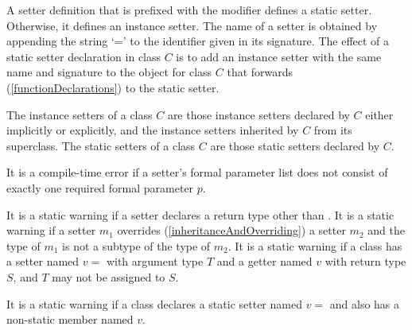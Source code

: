 \documentclass{article}
\begin{document}

\LMHash{}
A setter definition that is prefixed with the \STATIC{} modifier defines a static setter.
Otherwise, it defines an instance setter.
The name of a setter is obtained by appending the string `=' to the identifier given in its signature.
The effect of a static setter declaration in class $C$ is to add an instance setter with the same name and signature to the  object for class $C$ that forwards (\ref{functionDeclarations}) to the static setter.


\LMHash{}
The instance setters of a class $C$ are those instance setters declared by $C$ either implicitly or explicitly, and the instance setters inherited by $C$ from its superclass.
The static setters of a class $C$ are those static setters declared by $C$.

\LMHash{}
It is a compile-time error if a setter's formal parameter list does not consist of exactly one required formal parameter $p$.


\LMHash{}
It is a static warning if a setter declares a return type other than \VOID{}.
It is a static warning if a setter $m_1$ overrides (\ref{inheritanceAndOverriding}) a setter $m_2$ and the type of $m_1$ is not a subtype of the type of $m_2$.
It is a static warning if a class has a setter named $v=$ with argument type $T$ and a getter named $v$ with return type $S$, and $T$ may not be assigned to $S$.

\LMHash{}
It is a static warning if a class declares a static setter named $v=$ and also has a non-static member named $v$.

\end{document}
